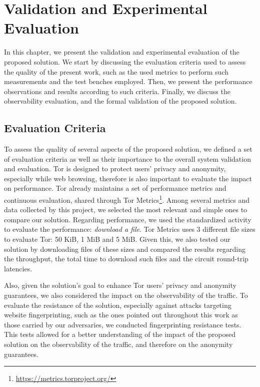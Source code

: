 
%

\chapter{Validation and Experimental Evaluation}\label{cha:validation}

In this chapter, we present the validation and experimental evaluation of the proposed solution. We start by discussing the evaluation criteria used to assess the quality of the present work, such as the used metrics to perform such measurements and the test benches employed. Then, we present the performance observations and results according to such criteria. 
Finally, we discuss the observability evaluation, and the formal validation of the proposed solution.

\section{Evaluation Criteria}\label{sec:evaluation_criteria}
To assess the quality of several aspects of the proposed solution, we defined a set of evaluation criteria as well as their importance to the overall system validation and evaluation. Tor is designed to protect users' privacy and anonymity, especially while web browsing, therefore is also important to evaluate the impact on performance. Tor already maintains a set of performance metrics and continuous evaluation, shared through Tor Metrics\footnote{\url{https://metrics.torproject.org/}}. Among several metrics and data collected by this project, we selected the most relevant and simple ones to compare our solution. Regarding performance, we used the standardized activity to evaluate the performance: \textit{download a file}. Tor Metrics uses 3 different file sizes to evaluate Tor: 50 KiB, 1 MiB and 5 MiB. Given this, we also tested our solution by downloading files of these sizes and compared the results regarding the throughput, the total time to download such files and the circuit round-trip latencies.

Also, given the solution's goal to enhance Tor users' privacy and anonymity guarantees, we also considered the impact on the observability of the traffic. To evaluate the resistance of the solution, especially against attacks targeting website fingerprinting, such as the ones pointed out throughout this work as those carried by our adversaries, we conducted fingerprinting resistance tests. This tests allowed for a better understanding of the impact of the proposed solution on the observability of the traffic, and therefore on the anonymity guarantees. 

